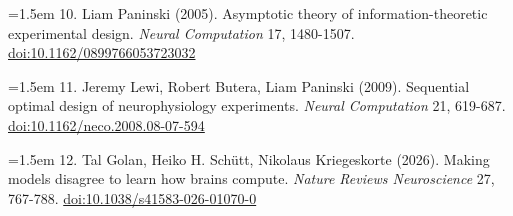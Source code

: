 \documentclass[11pt,letterpaper]{article}
\begin{document}
\noindent\hangindent=1.5em 10. Liam Paninski (2005). Asymptotic theory of information-theoretic experimental design. \emph{Neural Computation} 17, 1480-1507. \href{https://doi.org/10.1162/0899766053723032}{doi:10.1162/0899766053723032}\par\smallskip

\noindent\hangindent=1.5em 11. Jeremy Lewi, Robert Butera, Liam Paninski (2009). Sequential optimal design of neurophysiology experiments. \emph{Neural Computation} 21, 619-687. \href{https://doi.org/10.1162/neco.2008.08-07-594}{doi:10.1162/neco.2008.08-07-594}\par\smallskip

\noindent\hangindent=1.5em 12. Tal Golan, Heiko H. Schütt, Nikolaus Kriegeskorte (2026). Making models disagree to learn how brains compute. \emph{Nature Reviews Neuroscience} 27, 767-788. \href{https://doi.org/10.1038/s41583-026-01070-0}{doi:10.1038/s41583-026-01070-0}\par\smallskip
\end{document}
